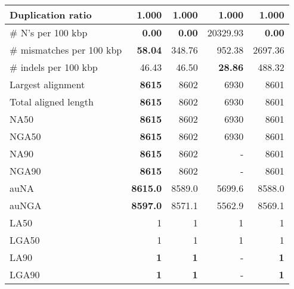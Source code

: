 \documentclass[12pt,a4paper]{article}
\begin{document}
\begin{table}[ht]
\begin{center}
\begin{tabular}{|l*{4}{|r}|}
Duplication ratio & 1.000 & 1.000 & 1.000 & 1.000 \\ \hline
\# N's per 100 kbp & {\bf 0.00} & {\bf 0.00} & 20329.93 & {\bf 0.00} \\ \hline
\# mismatches per 100 kbp & {\bf 58.04} & 348.76 & 952.38 & 2697.36 \\ \hline
\# indels per 100 kbp & 46.43 & 46.50 & {\bf 28.86} & 488.32 \\ \hline
Largest alignment & {\bf 8615} & 8602 & 6930 & 8601 \\ \hline
Total aligned length & {\bf 8615} & 8602 & 6930 & 8601 \\ \hline
NA50 & {\bf 8615} & 8602 & 6930 & 8601 \\ \hline
NGA50 & {\bf 8615} & 8602 & 6930 & 8601 \\ \hline
NA90 & {\bf 8615} & 8602 & - & 8601 \\ \hline
NGA90 & {\bf 8615} & 8602 & - & 8601 \\ \hline
auNA & {\bf 8615.0} & 8589.0 & 5699.6 & 8588.0 \\ \hline
auNGA & {\bf 8597.0} & 8571.1 & 5562.9 & 8569.1 \\ \hline
LA50 & 1 & 1 & 1 & 1 \\ \hline
LGA50 & 1 & 1 & 1 & 1 \\ \hline
LA90 & {\bf 1} & {\bf 1} & - & {\bf 1} \\ \hline
LGA90 & {\bf 1} & {\bf 1} & - & {\bf 1} \\ \hline
\end{tabular}
\end{center}
\end{table}
\end{document}
